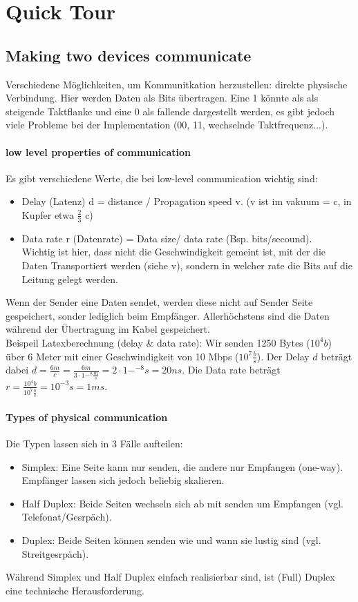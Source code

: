 \section{Quick Tour}
\subsection{Making two devices communicate}
	Verschiedene Möglichkeiten, um Kommunitkation herzustellen: direkte physische Verbindung. Hier werden Daten als Bits übertragen. Eine 1 könnte als als steigende Taktflanke und eine 0 als fallende dargestellt werden, es gibt jedoch viele Probleme bei der Implementation (00, 11, wechselnde Taktfrequenz...).
	\paragraph{low level properties of communication}
		Es gibt verschiedene Werte, die bei low-level communication wichtig sind: 
		\begin{itemize}
			\item Delay (Latenz) d = distance / Propagation speed v. (v ist im vakuum = c, in Kupfer etwa $\frac{2}{3}$ c)
			\item Data rate r (Datenrate) = Data size/ data rate (Bsp. bits/secound). \\ Wichtig ist hier, dass nicht die Geschwindigkeit gemeint ist, mit der die Daten Transportiert werden (siehe v), sondern in welcher rate die Bits auf die Leitung gelegt werden.
		\end{itemize}
		
		Wenn der Sender eine Daten sendet, werden diese nicht auf Sender Seite gespeichert, sonder lediglich beim Empfänger. Allerhöchstens sind die Daten während der Übertragung im Kabel gespeichert. \\
		Beispeil Latexberechnung (delay \& data rate): Wir senden 1250 Bytes ($10^4b$) über 6 Meter mit einer Geschwindigkeit von 10 Mbps ($10^7 \frac{b}{s}$). Der Delay $d$ beträgt dabei $d = \frac{6m}{c} = \frac{6m}{3\cdot 1-^8\frac{m}{s}} = 2\cdot1-^{-8}s = 20ns$. Die Data rate beträgt $r= \frac{10^4b}{10^7\frac{b}{s}} = 10^{-3}s = 1ms$. 
	\paragraph{Types of physical communication}
		Die Typen lassen sich in 3 Fälle aufteilen:
		\begin{itemize}
			\item Simplex: Eine Seite kann nur senden, die andere nur Empfangen (one-way). Empfänger lassen sich jedoch beliebig skalieren.
			\item Half Duplex: Beide Seiten wechseln sich ab mit senden um Empfangen (vgl. Telefonat/Gesrpäch).
			\item Duplex: Beide Seiten können senden wie und wann sie lustig sind (vgl. Streitgesrpäch).
		\end{itemize}
		Während Simplex und Half Duplex einfach realisierbar sind, ist (Full) Duplex eine technische Herausforderung. 
